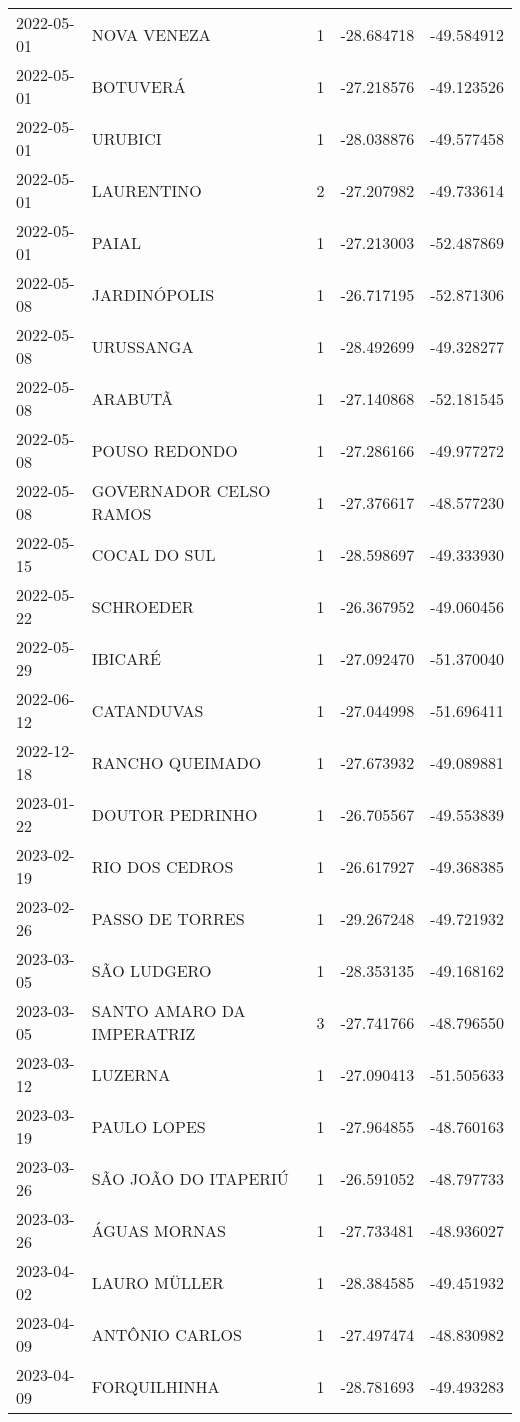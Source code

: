 \documentclass[
	12pt,				%
	openright,			%
	oneside,			%
	a4paper,			%
	english,			%
	french,				%
	spanish,			%
	brazil				%
	dvipsnames, table]{abntex2}
\begin{document}
\begin{longtable}[htbp]{llcrr}
2022-05-01 & NOVA VENEZA & 1 & -28.684718 & -49.584912 \\
2022-05-01 & BOTUVERÁ & 1 & -27.218576 & -49.123526 \\
2022-05-01 & URUBICI & 1 & -28.038876 & -49.577458 \\
2022-05-01 & LAURENTINO & 2 & -27.207982 & -49.733614 \\
2022-05-01 & PAIAL & 1 & -27.213003 & -52.487869 \\
2022-05-08 & JARDINÓPOLIS & 1 & -26.717195 & -52.871306 \\
2022-05-08 & URUSSANGA & 1 & -28.492699 & -49.328277 \\
2022-05-08 & ARABUTÃ & 1 & -27.140868 & -52.181545 \\
2022-05-08 & POUSO REDONDO & 1 & -27.286166 & -49.977272 \\
2022-05-08 & GOVERNADOR CELSO RAMOS & 1 & -27.376617 & -48.577230 \\
2022-05-15 & COCAL DO SUL & 1 & -28.598697 & -49.333930 \\
2022-05-22 & SCHROEDER & 1 & -26.367952 & -49.060456 \\
2022-05-29 & IBICARÉ & 1 & -27.092470 & -51.370040 \\
2022-06-12 & CATANDUVAS & 1 & -27.044998 & -51.696411 \\
2022-12-18 & RANCHO QUEIMADO & 1 & -27.673932 & -49.089881 \\
2023-01-22 & DOUTOR PEDRINHO & 1 & -26.705567 & -49.553839 \\
2023-02-19 & RIO DOS CEDROS & 1 & -26.617927 & -49.368385 \\
2023-02-26 & PASSO DE TORRES & 1 & -29.267248 & -49.721932 \\
2023-03-05 & SÃO LUDGERO & 1 & -28.353135 & -49.168162 \\
2023-03-05 & SANTO AMARO DA IMPERATRIZ & 3 & -27.741766 & -48.796550 \\
2023-03-12 & LUZERNA & 1 & -27.090413 & -51.505633 \\
2023-03-19 & PAULO LOPES & 1 & -27.964855 & -48.760163 \\
2023-03-26 & SÃO JOÃO DO ITAPERIÚ & 1 & -26.591052 & -48.797733 \\
2023-03-26 & ÁGUAS MORNAS & 1 & -27.733481 & -48.936027 \\
2023-04-02 & LAURO MÜLLER & 1 & -28.384585 & -49.451932 \\
2023-04-09 & ANTÔNIO CARLOS & 1 & -27.497474 & -48.830982 \\
2023-04-09 & FORQUILHINHA & 1 & -28.781693 & -49.493283 \\

\end{longtable}
\end{document}
